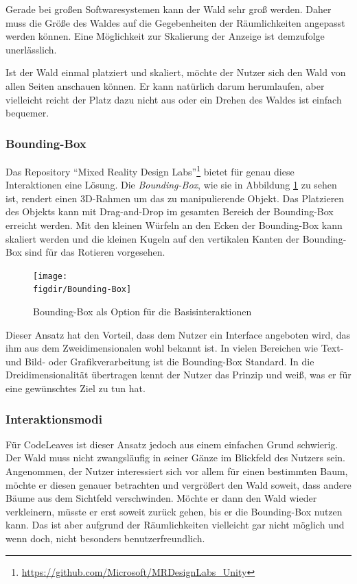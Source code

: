 Gerade bei großen Softwaresystemen kann der Wald sehr groß werden. Daher muss die Größe des Waldes auf die Gegebenheiten der Räumlichkeiten angepasst werden können. Eine Möglichkeit zur Skalierung der Anzeige ist demzufolge unerlässlich.

Ist der Wald einmal platziert und skaliert, möchte der Nutzer sich den Wald von allen Seiten anschauen können. Er kann natürlich darum herumlaufen, aber vielleicht reicht der Platz dazu nicht aus oder ein Drehen des Waldes ist einfach bequemer.

\subsubsection*{Bounding-Box}

Das Repository "`Mixed Reality Design Labs"'\footnote{\url{https://github.com/Microsoft/MRDesignLabs_Unity}} bietet für genau diese Interaktionen eine Lösung. Die \textit{Bounding-Box}, wie sie in Abbildung \ref{fig:Bounding-Box} zu sehen ist, rendert einen 3D-Rahmen um das zu manipulierende Objekt. Das Platzieren des Objekts kann mit Drag-and-Drop im gesamten Bereich der Bounding-Box erreicht werden. Mit den kleinen Würfeln an den Ecken der Bounding-Box kann skaliert werden und die kleinen Kugeln auf den vertikalen Kanten der Bounding-Box sind für das Rotieren vorgesehen.

\begin{figure}[htb]
  \texttt{[image: \\figdir/Bounding-Box]}
  \caption{Bounding-Box als Option für die Basisinteraktionen \cite{microsoft2017mixed}}
  \label{fig:Bounding-Box}
\end{figure}

Dieser Ansatz hat den Vorteil, dass dem Nutzer ein Interface angeboten wird, das ihm aus dem Zweidimensionalen wohl bekannt ist. In vielen Bereichen wie Text- und Bild- oder Grafikverarbeitung ist die Bounding-Box Standard. In die Dreidimensionalität übertragen kennt der Nutzer das Prinzip und weiß, was er für eine gewünschtes Ziel zu tun hat.

\subsubsection*{Interaktionsmodi}

Für CodeLeaves ist dieser Ansatz jedoch aus einem einfachen Grund schwierig. Der Wald muss nicht zwangsläufig in seiner Gänze im Blickfeld des Nutzers sein. Angenommen, der Nutzer interessiert sich vor allem für einen bestimmten Baum, möchte er diesen genauer betrachten und vergrößert den Wald soweit, dass andere Bäume aus dem Sichtfeld verschwinden. Möchte er dann den Wald wieder verkleinern, müsste er erst soweit zurück gehen, bis er die Bounding-Box nutzen kann. Das ist aber aufgrund der Räumlichkeiten vielleicht gar nicht möglich und wenn doch, nicht besonders benutzerfreundlich.

